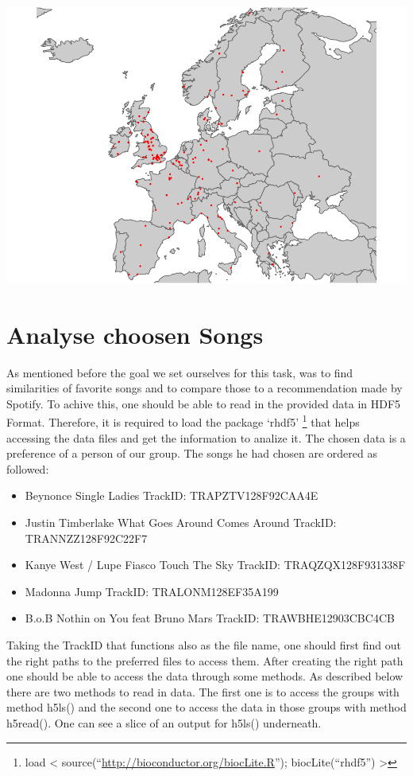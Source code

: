 \documentclass[]{article}
\let\rmarkdownfootnote\footnote%
\def\footnote{\protect\rmarkdownfootnote}
\begin{document}
\includegraphics{Project2_files/figure-latex/europemapArtist-1.pdf}

\section{Analyse choosen Songs}\label{analyse-choosen-songs}

As mentioned before the goal we set ourselves for this task, was to find
similarities of favorite songs and to compare those to a recommendation
made by Spotify. To achive this, one should be able to read in the
provided data in HDF5 Format. Therefore, it is required to load the
package `rhdf5' \footnote{load \textless{}
  source(``\url{http://bioconductor.org/biocLite.R}'');
  biocLite(``rhdf5'') \textgreater{}} that helps accessing the data
files and get the information to analize it. The chosen data is a
preference of a person of our group. The songs he had chosen are ordered
as followed:

\begin{itemize}
\item
  Beynonce Single Ladies TrackID: TRAPZTV128F92CAA4E 
\item
  Justin Timberlake What Goes Around Comes Around TrackID:
  TRANNZZ128F92C22F7 
\item
  Kanye West / Lupe Fiasco Touch The Sky TrackID: TRAQZQX128F931338F 
\item
  Madonna Jump TrackID: TRALONM128EF35A199 
\item
  B.o.B Nothin on You feat Bruno Mars TrackID: TRAWBHE12903CBC4CB 
\end{itemize}

Taking the TrackID that functions also as the file name, one should
first find out the right paths to the preferred files to access them.
After creating the right path one should be able to access the data
through some methods. As described below there are two methods to read
in data. The first one is to access the groups with method h5ls() and
the second one to access the data in those groups with method h5read().
One can see a slice of an output for h5ls() underneath.
\end{document}
